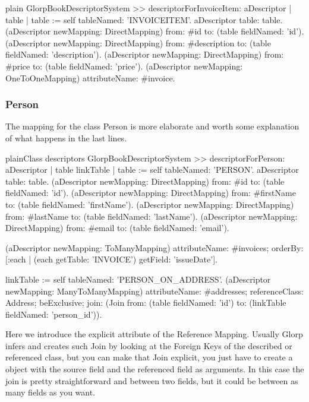 \documentclass[10pt,twoside,english]{_support/latex/sbabook/sbabook}
\begin{document}
\begin{displaycode}{plain}
GlorpBookDescriptorSystem >> descriptorForInvoiceItem: aDescriptor
	| table |
	table := self tableNamed: 'INVOICEITEM'.
	aDescriptor table: table.
	(aDescriptor newMapping: DirectMapping)
		from: #id
		to: (table fieldNamed: 'id').
	(aDescriptor newMapping: DirectMapping)
		from: #description
		to: (table fieldNamed: 'description').
	(aDescriptor newMapping: DirectMapping)
		from: #price
		to: (table fieldNamed: 'price').
	(aDescriptor newMapping: OneToOneMapping)
		attributeName: #invoice.
\end{displaycode}
\subsubsection{Person}
The mapping for the class Person is more elaborate and worth some explanation
of what happens in the last lines.

\begin{listing}[float]{plain}{Class descriptors}
GlorpBookDescriptorSystem >> descriptorForPerson: aDescriptor
	| table linkTable |
	table := self tableNamed: 'PERSON'.
	aDescriptor table: table.
	(aDescriptor newMapping: DirectMapping)
		from: #id
		to: (table fieldNamed: 'id').
	(aDescriptor newMapping: DirectMapping)
		from: #firstName
		to: (table fieldNamed: 'firstName').
	(aDescriptor newMapping: DirectMapping)
		from: #lastName
		to: (table fieldNamed: 'lastName').
	(aDescriptor newMapping: DirectMapping)
		from: #email
		to: (table fieldNamed: 'email').

	(aDescriptor newMapping: ToManyMapping)
		attributeName: #invoices;
		orderBy: [:each |
			(each getTable: 'INVOICE') getField: 'issueDate'].

	linkTable := self tableNamed: 'PERSON_ON_ADDRESS'.
	(aDescriptor newMapping: ManyToManyMapping)
		attributeName: #addresses;
		referenceClass: Address;
		beExclusive;
		join: (Join
			from: (table fieldNamed: 'id')
			to: (linkTable fieldNamed: 'person_id')).
\end{listing}

Here we introduce the explicit  attribute of the Reference Mapping.
Usually Glorp infers and creates such Join by looking at the Foreign Keys
of the described or referenced class, but you can make that Join explicit,
you just have to create a  object with the source field and the
referenced field as arguments. In this case the join is pretty straightforward
and between two fields, but it could be between as many fields as you want.
\end{document}
